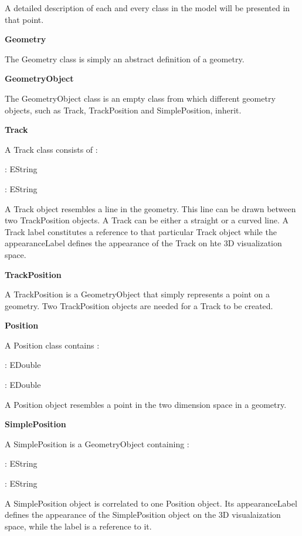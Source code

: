 A detailed description of each and every class in the model will be presented in that point. 

\textbf{Geometry}

The Geometry class is simply an abstract definition of a geometry. 

\textbf{GeometryObject}

The GeometryObject class is an empty class from which different geometry objects, such as Track, TrackPosition and SimplePosition, inherit. 

\textbf{Track}

A Track class consists of :
\begin{description}[labelindent=1cm]
  \item[appearanceLabel]: EString
  \item[label]: EString
\end{description}

A Track object resembles a line in the geometry. This line can be drawn between two TrackPosition objects. A Track can be either a straight or a curved line. A Track label constitutes a reference to that particular Track object while the appearanceLabel defines the appearance of the Track on hte 3D visualization space. 

\textbf{TrackPosition}

A TrackPosition is a GeometryObject that simply represents a point on a geometry. Two TrackPosition objects are needed for a Track to be created.

\textbf{Position}

A Position class contains :

\begin{description}[labelindent=1cm]
  \item[x]: EDouble
  \item[y]: EDouble
\end{description}

A Position object resembles a point in the two dimension space in a geometry. 

\textbf{SimplePosition}

A SimplePosition is a GeometryObject containing : 

\begin{description}[labelindent=1cm]
  \item[appearanceLabel]: EString
  \item[label]: EString
\end{description}

A SimplePosition object is correlated to one Position object. Its appearanceLabel defines the appearance of the SimplePosition object on the 3D visualaization space, while the label is a reference to it. 



